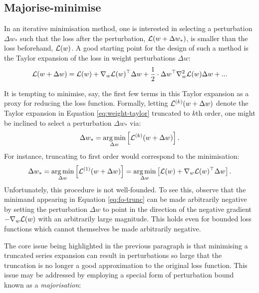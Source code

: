 \begin{refsection}
\section{Majorise-minimise}\label{sec:mm}

In an iterative minimisation method, one is interested in selecting a perturbation $\Delta w_*$ such that the loss after the perturbation, $\mathcal{L}(w+\Delta w_*)$, is smaller than the loss beforehand, $\mathcal{L}(w)$. A good starting point for the design of such a method is the Taylor expansion of the loss in weight perturbations $\Delta w$:
\begin{equation}\label{eq:weight-taylor}
    \mathcal{L}(w+\Delta w) = \mathcal{L}(w) + \nabla_w \mathcal{L}(w)^\top \Delta w + \frac{1}{2}\cdot \Delta w ^\top \nabla_w^2\mathcal{L}(w)\Delta w + ...
\end{equation}

It is tempting to minimise, say, the first few terms in this Taylor expansion as a proxy for reducing the loss function. Formally, letting $\mathcal{L}^{(k)}(w+\Delta w)$ denote the Taylor expansion in Equation \ref{eq:weight-taylor} truncated to $k$th order, one might be inclined to select a perturbation $\Delta w_*$ via:
\begin{equation}
    \Delta w_* = \operatorname*{arg\,min}_{\Delta w}\left[\mathcal{L}^{(k)}(w+\Delta w)\right].
\end{equation}
For instance, truncating to first order would correspond to the minimisation:
\begin{equation}\label{eq:fo-trunc}
    \Delta w_* =\operatorname*{arg\,min}_{\Delta w}\left[\mathcal{L}^{(1)}(w+\Delta w)\right]= \operatorname*{arg\,min}_{\Delta w}\left[\mathcal{L}(w) + \nabla_w \mathcal{L}(w)^\top \Delta w \right].
\end{equation}
Unfortunately, this procedure is not well-founded. To see this, observe that the minimand appearing in Equation \ref{eq:fo-trunc} can be made arbitrarily negative by setting the perturbation $\Delta w$ to point in the direction of the negative gradient $-\nabla_w \mathcal{L}(w)$ with an arbitrarily large magnitude. This holds even for bounded loss functions which cannot themselves be made arbitrarily negative.

The core issue being highlighted in the previous paragraph is that minimising a truncated series expansion can result in perturbations so large that the truncation is no longer a good approximation to the original loss function. This issue may be addressed by employing a special form of perturbation bound known as a \textit{majorisation}: 


\end{refsection}
